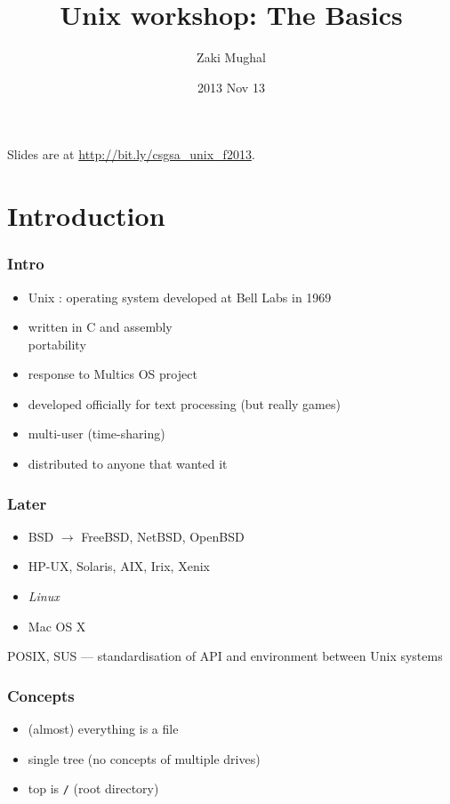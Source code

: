 \documentclass[%
        hyperref={%
                pdfauthor={Zakariyya Mughal},%
                pdfpagemode={None},pdfpagelayout={SinglePage}}%
        xcolor={x11names},%
]{beamer}
\title[Unix Basics]{Unix workshop: The Basics}
\author{Zaki Mughal}
\institute{Computational Biomedicine Lab\\University of Houston}
\date{2013 Nov 13}
\begin{document}
\frame{\titlepage}
\begin{frame}
	Slides are at \url{http://bit.ly/csgsa_unix_f2013}.
\end{frame}
\section{Introduction}\frame{\insertsection}
\begin{frame}
	\frametitle{Intro}
	\begin{itemize}
		\item Unix : operating system developed at Bell
			Labs in 1969
		\pause\item written in C and assembly \\
			\pause \qquad portability
		\pause\item response to Multics OS project
		\pause \item developed officially for text processing \pause (but
			really games)
		\pause \item multi-user (time-sharing)
		\pause \item distributed to anyone that wanted it
	\end{itemize}
\end{frame}

\begin{frame}
	\frametitle{Later}
	\begin{itemize}
		\item BSD $\rightarrow$ FreeBSD, NetBSD, OpenBSD
		\pause \item HP-UX, Solaris, AIX, Irix, Xenix
		\pause \item \emph{Linux}
		\pause \item Mac OS X
	\end{itemize}

	\pause POSIX, SUS --- standardisation of API and environment between
	Unix systems
\end{frame}

\begin{frame}
	\frametitle{Concepts}
	\begin{itemize}
		\item (almost) everything is a file
		\item single tree (no concepts of multiple drives)
		\item top is \texttt{/} (root directory)
	\end{itemize}
\end{frame}
\end{document}
